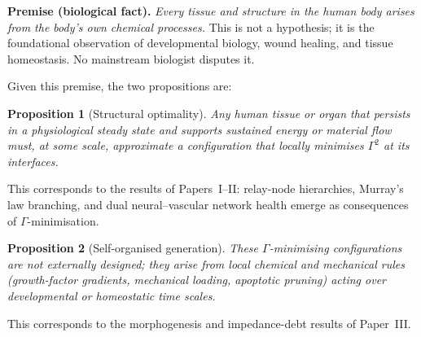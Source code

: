 \documentclass[aps,pre,twocolumn,superscriptaddress,floatfix]{revtex4-2}
\newtheorem{proposition}{Proposition}
\begin{document}
\medskip\noindent
\textbf{Premise (biological fact).}
\emph{Every tissue and structure in the human body arises
from the body's own chemical processes.}
This is not a hypothesis; it is the foundational observation
of developmental biology, wound healing, and tissue
homeostasis.  No mainstream biologist disputes it.

\medskip
Given this premise, the two propositions are:

\begin{proposition}[Structural optimality]
\label{prop:structural}
Any human tissue or organ that persists in a physiological
steady state and supports sustained energy or material flow
must, at some scale, approximate a configuration that
locally minimises $\Gamma^2$ at its interfaces.
\end{proposition}

This corresponds to the results of Papers~I--II:
relay-node hierarchies, Murray's law branching,
and dual neural--vascular network health emerge as
consequences of $\Gamma$-minimisation.

\begin{proposition}[Self-organised generation]
\label{prop:generative}
These $\Gamma$-minimising configurations are not
externally designed; they arise from local chemical and
mechanical rules (growth-factor gradients, mechanical
loading, apoptotic pruning) acting over developmental
or homeostatic time scales.
\end{proposition}

This corresponds to the morphogenesis and impedance-debt
results of Paper~III.
\end{document}
